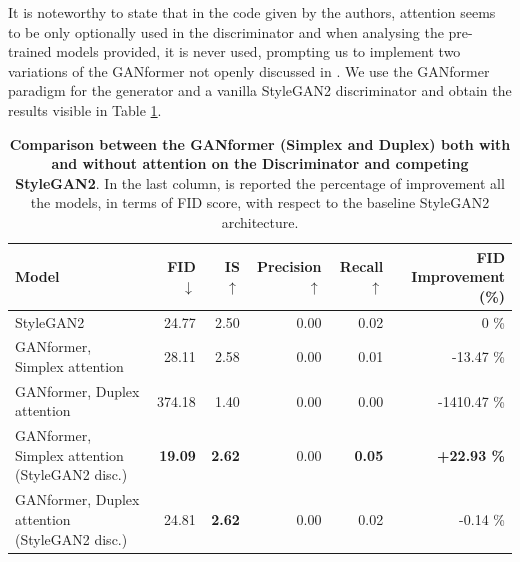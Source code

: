 \documentclass{article}
\begin{document}
	It is noteworthy to state that in the code given by the authors, attention seems to be only optionally 
	used in the discriminator and when analysing the pre-trained models provided, it is never used,
	prompting us to implement two variations of the GANformer not openly 
	discussed in \cite{hudson2021generative}.
	We use the GANformer paradigm for the generator and a vanilla StyleGAN2 discriminator and 
	obtain the results visible in Table \ref{tab:our-results2}.
	\begin{table}[htb]
		\centering
		\caption{\textbf{Comparison between the GANformer (Simplex and Duplex) both with and without 
				attention on the Discriminator and competing StyleGAN2}.  In the last column, is reported 
				the 
			percentage of improvement all the models, in terms of FID score, with respect to the baseline 
			StyleGAN2 architecture.}
		\label{tab:our-results2}
		\vspace{3mm}
		\small
		\begin{tabular}{l|rrrrr}
			\toprule
			
			\textbf{Model}  & \textbf{FID $\downarrow$}  & \textbf{IS $\uparrow$} & 
			\textbf{Precision$\uparrow$}  & \textbf{Recall $\uparrow$} & \textbf{FID Improvement (\%)}\\ 
			\midrule
			StyleGAN2                    &  24.77 & 2.50 & 0.00 & 0.02 & 0 \%\\ 
			GANformer, Simplex attention & 28.11 & 2.58 & 0.00 & 0.01 & -13.47 \%\\ 
			GANformer, Duplex attention  & 374.18 & 1.40 & 0.00 & 0.00 & -1410.47  \%\\ 
			GANformer, Simplex attention (StyleGAN2 disc.) & \textbf{19.09} &  \textbf{2.62}  &  0.00    & 
			\textbf{0.05}  & 
			\textbf{+22.93 \%} \\ 
			GANformer, Duplex attention (StyleGAN2 disc.)  &  24.81  & \textbf{2.62} &   0.00   & 0.02 & 
			-0.14 \%\\ 
			\bottomrule
		\end{tabular}
	\end{table}
	
\end{document}
